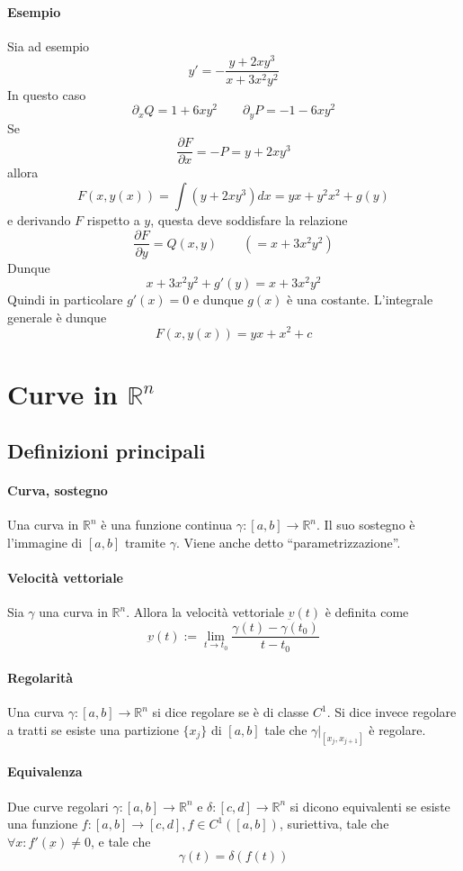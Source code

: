 \documentclass[a4paper,12pt]{article}
\begin{document}
\paragraph{Esempio}
Sia ad esempio
$$y'=-\frac{y+2xy^3}{x+3x^2y^2}$$
In questo caso
$$\partial_xQ=1+6xy^2\qquad \partial_yP=-1-6xy^2$$
Se
$$\frac{\partial F}{\partial x}=-P = y+2xy^3$$
allora
$$F(x,y(x)) = \int (y+2xy^3)dx = yx+y^2x^2 + g(y)$$
e derivando $F$ rispetto a $y$, questa deve soddisfare la relazione
$$\frac{\partial F}{\partial y}=Q(x,y)\qquad(=x+3x^2y^2)$$
Dunque
$$x+3x^2y^2+g'(y)=x+3x^2y^2$$
Quindi in particolare $g'(x) = 0$ e dunque $g(x)$ è una costante. L'integrale generale è dunque
$$F(x, y(x)) = yx+x^2 + c$$

\section{Curve in $\mathbb{R}^n$}
\subsection{Definizioni principali}
\paragraph{Curva, sostegno}
Una curva in $\mathbb{R}^n$ è una funzione continua $\gamma:[a,b]\rightarrow\mathbb{R}^n$.
Il suo sostegno è l'immagine di $[a,b]$ tramite $\gamma$. Viene anche detto ``parametrizzazione''.
\paragraph{Velocità vettoriale}
Sia $\gamma$ una curva in $\mathbb{R}^n$. Allora la velocità vettoriale $\underbar{v}(t)$ è definita come
$$\underbar{v}(t) := \lim_{t\to t_0} \dfrac{\gamma(t)-\gamma(t_0)}{t-t_0}$$

\paragraph{Regolarità}
Una curva $\gamma:[a,b]\rightarrow\mathbb{R}^n$ si dice regolare se è di classe $C^1$. Si dice invece regolare a tratti se esiste una partizione $\{x_j\}$ di $[a,b]$ tale che $\gamma|_{[x_j, x_{j+1}]}$ è regolare.
\paragraph{Equivalenza}
Due curve regolari $\gamma :[a,b]\rightarrow\mathbb{R}^n$ e $\delta :[c,d]\rightarrow\mathbb{R}^n$ si dicono equivalenti se esiste una funzione 
$f:[a,b]\rightarrow[c,d], f \in C^1([a,b])$, suriettiva, tale che $\forall x: f'(\underbar{x}) \neq 0$, e tale che
$$\gamma(t) = \delta(f(t))$$
\end{document}
